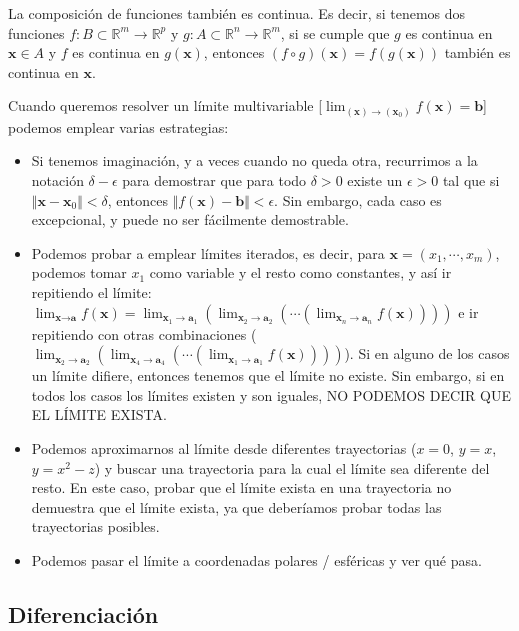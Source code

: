 \documentclass[a4paper]{article}
\begin{document}
La composición de funciones también es continua. Es decir, si tenemos dos funciones $f:B\subset\mathbb{R}^m\rightarrow\mathbb{R}^p$ y $g:A\subset\mathbb{R}^n\rightarrow\mathbb{R}^m$, si se cumple que $g$ es continua en $\textbf{x} \in A$ y $f$ es continua en $g(\textbf{x})$, entonces $(f \circ g)(\textbf{x}) = f(g(\textbf{x}))$ también es continua en $\textbf{x}$.

Cuando queremos resolver un límite multivariable [$\lim_{(\textbf{x})\rightarrow(\textbf{x}_0)} f(\textbf{x}) = \textbf{b}$] podemos emplear varias estrategias:
\begin{itemize}
	\item Si tenemos imaginación, y a veces cuando no queda otra, recurrimos a la notación $\delta-\epsilon$ para demostrar que para todo $\delta>0$ existe un $\epsilon>0$ tal que si $\Vert\textbf{x}- \textbf{x}_0\Vert < \delta$, entonces $\Vert f(\textbf{x}) - \textbf{b}\Vert < \epsilon$. Sin embargo, cada caso es excepcional, y puede no ser fácilmente demostrable.
	\item Podemos probar a emplear límites iterados, es decir, para $\textbf{x} = (x_1,\cdots, x_m)$, podemos tomar $x_1$ como variable y el resto como constantes, y así ir repitiendo el límite: $\lim_{\textbf{x}\rightarrow\textbf{a}} f(\textbf{x}) = \lim_{\textbf{x}_1\rightarrow\textbf{a}_1} (\lim_{\textbf{x}_2\rightarrow\textbf{a}_2}(\cdots ( \lim_{\textbf{x}_n\rightarrow\textbf{a}_n}f(\textbf{x}))))$ e ir repitiendo con otras combinaciones ($ \lim_{\textbf{x}_2\rightarrow\textbf{a}_2} (\lim_{\textbf{x}_4\rightarrow\textbf{a}_4}(\cdots ( \lim_{\textbf{x}_1\rightarrow\textbf{a}_1}f(\textbf{x}))))$). Si en alguno de los casos un límite difiere, entonces tenemos que el límite no existe. Sin embargo, si en todos los casos los límites existen y son iguales, NO PODEMOS DECIR QUE EL LÍMITE EXISTA.
	\item Podemos aproximarnos al límite desde diferentes trayectorias ($x=0$, $y=x$, $y=x^2-z$) y buscar una trayectoria para la cual el límite sea diferente del resto. En este caso, probar que el límite exista en una trayectoria no demuestra que el límite exista, ya que deberíamos probar todas las trayectorias posibles.
	\item Podemos pasar el límite a coordenadas polares / esféricas y ver qué pasa. 
	\end{itemize}

\subsection{Diferenciación}
\end{document}
